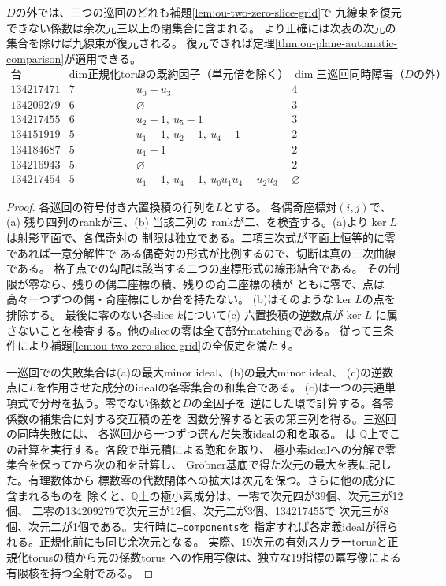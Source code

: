 \begin{proposition}[少数零の全巡回格子障害の余次元]
\label{prop:ou-few-zero-cyclic-codimension}
$D$の外では、三つの巡回のどれも補題\ref{lem:ou-two-zero-slice-grid}で
九線束を復元できない係数は余次元三以上の閉集合に含まれる。
より正確には次表の次元の集合を除けば九線束が復元される。
復元できれば定理\ref{thm:ou-plane-automatic-comparison}が適用できる。
\[
\begin{array}{r|c|l|c}
\text{台}&\dim\text{正規化torus}&D\text{の既約因子（単元倍を除く）}
 &\dim\text{三巡回同時障害（}D\text{の外）}\\\hline
134217471&7&u_0-u_3&4\\
134209279&6&\varnothing&3\\
134217455&6&u_2-1,\ u_5-1&3\\
134151919&5&u_1-1,\ u_2-1,\ u_4-1&2\\
134184687&5&u_1-1&2\\
134216943&5&\varnothing&2\\
134217454&5&u_1-1,\ u_4-1,\ u_0u_1u_4-u_2u_3&\varnothing
\end{array}
\]
\end{proposition}
\begin{proof}
各巡回の符号付き六置換積の行列を$L$とする。
各偶奇座標対$(i,j)$で、(a) 残り四列のrankが三、(b) 当該二列の
rankが二、を検査する。(a)より$\ker L$は射影平面で、各偶奇対の
制限は独立である。二項三次式が平面上恒等的に零であれば一意分解性で
ある偶奇対の形式が比例するので、切断は真の三次曲線である。
格子点での勾配は該当する二つの座標形式の線形結合である。
その制限が零なら、残りの偶二座標の積、残りの奇二座標の積が
ともに零で、点は高々一つずつの偶・奇座標にしか台を持たない。
(b)はそのような$\ker L$の点を排除する。
最後に零のない各slice $k$について(c) 六置換積の逆数点が$\ker L$
に属さないことを検査する。他のsliceの零は全て部分matchingである。
従って三条件により補題\ref{lem:ou-two-zero-slice-grid}の全仮定を満たす。

一巡回での失敗集合は(a)の最大minor ideal、(b)の最大minor ideal、
(c)の逆数点に$L$を作用させた成分のidealの各零集合の和集合である。
(c)は一つの共通単項式で分母を払う。零でない係数と$D$の全因子を
逆にした環で計算する。各零係数の補集合に対する交互積の差を
因数分解すると表の第三列を得る。三巡回の同時失敗には、
各巡回から一つずつ選んだ失敗idealの和を取る。
は
$\mathbb Q$上でこの計算を実行する。各段で単元積による飽和を取り、
極小素idealへの分解で零集合を保ってから次の和を計算し、
Gröbner基底で得た次元の最大を表に記した。有理数体から
標数零の代数閉体への拡大は次元を保つ。さらに他の成分に含まれるものを
除くと、$\mathbb Q$上の極小素成分は、一零で次元四が39個、次元三が12個、
二零の134209279で次元三が12個、次元二が3個、134217455で
次元三が8個、次元二が1個である。実行時に\texttt{--components}を
指定すれば各定義idealが得られる。正規化前にも同じ余次元となる。
実際、19次元の有効スカラーtorusと正規化torusの積から元の係数torus
への作用写像は、独立な19指標の冪写像による有限核を持つ全射である。
\end{proof}


